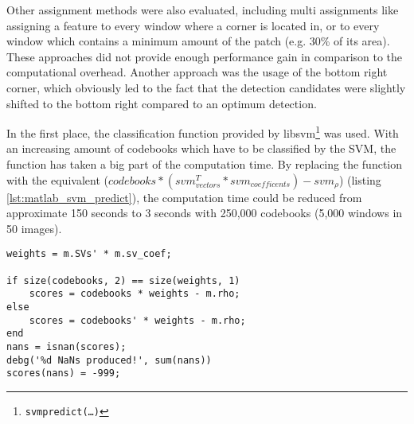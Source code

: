 Other assignment methods were also evaluated, including multi assignments like assigning a feature to every window where a corner is located in, or to every window which contains a minimum amount of the patch (e.g. 30\% of its area). These approaches did not provide enough performance gain in comparison to the computational overhead. Another approach was the usage of the bottom right corner, which obviously led to the fact that the detection candidates were slightly shifted to the bottom right compared to an optimum detection. 

In the first place, the classification function provided by libsvm\footnote{\texttt{svmpredict(\dots)}} was used. With an increasing amount of codebooks which have to be classified by the \ac{SVM}, the function has taken a big part of the computation time. By replacing the function with the \MATLAB equivalent ($codebooks * (svm_{vectors}^T * svm_{coefficents}) - svm_{\rho}$) (listing \ref{lst:matlab_svm_predict}), the computation time could be reduced from approximate 150 seconds to 3 seconds with 250,000 codebooks (5,000 windows in 50 images).


\begin{lstlisting}[caption={\MATLAB variant of svmpredict},label=lst:matlab_svm_predict]
weights = m.SVs' * m.sv_coef;

if size(codebooks, 2) == size(weights, 1)
    scores = codebooks * weights - m.rho;
else
    scores = codebooks' * weights - m.rho;
end
nans = isnan(scores);
debg('%d NaNs produced!', sum(nans))
scores(nans) = -999;
\end{lstlisting}
